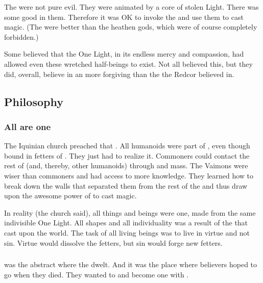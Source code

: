 The \qliphoth were not pure evil.
They were animated by a core of stolen Light.
There was some good in them. 
Therefore it was OK to invoke the \qliphoth and use them to cast magic. 
(The \qliphoth were better than the heathen gods, which were of course completely forbidden.)

Some believed that the One Light, in its endless mercy and compassion, had allowed even these wretched half-beings to exist.
Not all \Telcras believed this, but they did, overall, believe in an \Iquin more forgiving than the \Iquin the Redcor believed in. 









\subsection{Philosophy}





\subsubsection{All are one}
The Iquinian church preached that . 
All humanoids were part of \iquin, even though bound in fetters of \itzach.
They just had to realize it. 
Commoners could contact the rest of \iquin (and, thereby, other humanoids) through  and mass. 
The Vaimons were wiser than commoners and had access to more knowledge. 
They learned how to break down the walls that separated them from the rest of the \iquin and thus draw upon the awesome power of \iquin to cast magic. 

In reality (the church said), all things and beings were one, made from the same indivisible One Light. 
All shapes and all individuality was a result of the  that \itzach cast upon the world. 
The task of all living beings was to live in virtue and not sin.
Virtue would dissolve the fetters, but sin would forge new fetters. 




\subsubsection{\Atziluth}
\Atziluth was the abstract  where the \sephiroth dwelt.
And it was the place where believers hoped to go when they died.
They wanted to  and become one with \iquin. 

